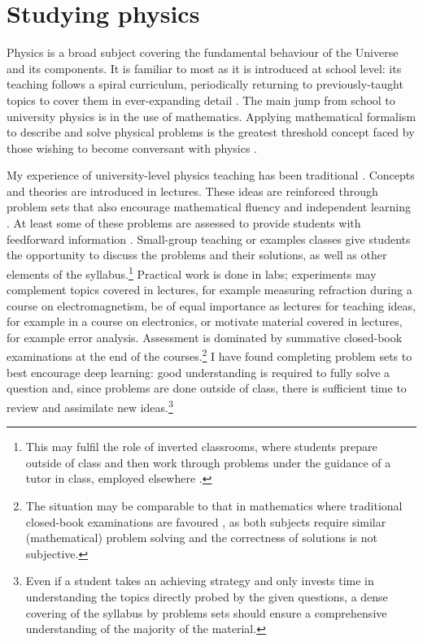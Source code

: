 \documentclass[a4paper, 11pt, twoside]{article}
\begin{document}
\section{Studying physics}\label{sec:physics}

Physics is a broad subject covering the fundamental behaviour of the Universe and its components. It is familiar to most as it is introduced at school level: its teaching follows a spiral curriculum, periodically returning to previously-taught topics to cover them in ever-expanding detail \citep{Bruner1960}. The main jump from school to university physics is in the use of mathematics. Applying mathematical formalism to describe and solve physical problems is the greatest threshold concept \citep{Meyer2003} faced by those wishing to become conversant with physics \citep{Wigner1960}.

My experience of university-level physics teaching has been traditional \citep[cf.][]{Iannone2015}. Concepts and theories are introduced in lectures. These ideas are reinforced through problem sets that also encourage mathematical fluency and independent learning \citep{Pike2015}. At least some of these problems are assessed to provide students with feedforward information \citep{Bloxham2015}. Small-group teaching or examples classes give students the opportunity to discuss the problems and their solutions, as well as other elements of the syllabus.\footnote{This may fulfil the role of inverted classrooms, where students prepare outside of class and then work through problems under the guidance of a tutor in class, employed elsewhere \citep{Lage2000}.} Practical work is done in labs; experiments may complement topics covered in lectures, for example measuring refraction during a course on electromagnetism, be of equal importance as lectures for teaching ideas, for example in a course on electronics, or motivate material covered in lectures, for example error analysis. Assessment is dominated by summative closed-book examinations at the end of the courses.\footnote{The situation may be comparable to that in mathematics where traditional closed-book examinations are favoured \citep{Iannone2014}, as both subjects require similar (mathematical) problem solving and the correctness of solutions is not subjective.} I have found completing problem sets to best encourage deep learning: good understanding is required to fully solve a question and, since problems are done outside of class, there is sufficient time to review and assimilate new ideas.\footnote{Even if a student takes an achieving strategy \citep[chapter 2]{Biggs1987} and only invests time in understanding the topics directly probed by the given questions, a dense covering of the syllabus by problems sets should ensure a comprehensive understanding of the majority of the material.}
\end{document}

